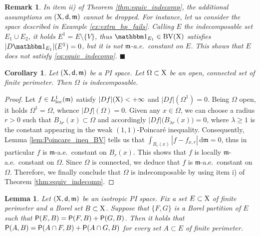 \documentclass[reqno]{amsart}
\numberwithin{equation}{section}
\newcommand{\X}{{\rm X}}
\newcommand{\sfd}{{\sf d}}
\newcommand{\mm}{\mathfrak m}
\renewcommand{\d}{{\mathrm d}}
\newcommand{\1}{\mathbbm 1}
\newcommand{\loc}{{\rm loc}}
\newcommand{\BV}{{\rm BV}}
\renewcommand{\P}{{\sf P}}
\newcommand{\fr}{\penalty-20\null\hfill\(\blacksquare\)}
\newtheorem{corollary}[theorem]{Corollary}
\newtheorem{lemma}[theorem]{Lemma}
\newtheorem{remark}[theorem]{Remark}
\begin{document}
%
%
\begin{remark}{\rm
In item ii) of Theorem \ref{thm:equiv_indecomp}, the additional assumptions
on \((\X,\sfd,\mm)\) cannot be dropped. For instance, let us consider the space
described in Example \ref{ex:extra_hp_fails}. Calling \(E\) the indecomposable set
\(E_1\cup E_2\), it holds \(E^1=E\setminus\{V\}\), thus
\(\1_{E_1}\in\BV(\X)\) satisfies \(|D\1_{E_1}|(E^1)=0\), but
it is not \(\mm\)-a.e.\ constant on \(E\).
This shows that \(E\) does not satisfy \eqref{eq:equiv_indecomp}.
\fr}\end{remark}
%
%
\begin{corollary}\label{cor:open_conn_is_indec}
Let \((\X,\sfd,\mm)\) be a PI space. Let \(\Omega\subset\X\) be an open,
connected set of finite perimeter. Then \(\Omega\) is indecomposable.
\end{corollary}
\begin{proof}
Let \(f\in L^1_\loc(\mm)\) satisfy \(|Df|(\X)<+\infty\) and \(|Df|(\Omega^1)=0\).
Being \(\Omega\) open, it holds \(\Omega^1=\Omega\), whence \(|Df|(\Omega)=0\).
Given any \(x\in\Omega\), we can choose a radius \(r>0\)
such that \(B_{\lambda r}(x)\subset\Omega\) and accordingly
\(|Df|\big(B_{\lambda r}(x)\big)=0\), where \(\lambda\geq 1\) is
the constant appearing in the weak \((1,1)\)-Poincar\'{e} inequality.
Consequently, Lemma \ref{lem:Poincare_ineq_BV} tells us that
\(\int_{B_r(x)}|f-f_{x,r}|\,\d\mm=0\), thus in particular
\(f\) is \(\mm\)-a.e.\ constant on \(B_r(x)\). This shows that
\(f\) is locally \(\mm\)-a.e.\ constant on \(\Omega\).
Since \(\Omega\) is connected, we deduce that \(f\) is \(\mm\)-a.e.\ constant
on \(\Omega\). Therefore, we finally conclude that \(\Omega\) is
indecomposable by using item i) of Theorem \ref{thm:equiv_indecomp}.
\end{proof}
%
%
\begin{lemma}\label{lem:aux_uniqueness_finite_case}
Let  \((\X,\sfd,\mm)\) be an isotropic PI space. Fix a set \(E\subset\X\) of finite
perimeter and a Borel set \(B\subset\X\). Suppose that \(\{F,G\}\) is a Borel
partition of \(E\) such that \(\P(E,B)=\P(F,B)+\P(G,B)\).
Then it holds that \(\P(A,B)=\P(A\cap F,B)+\P(A\cap G,B)\) for every set
\(A\subset E\) of finite perimeter.
\end{lemma}
\end{document}
